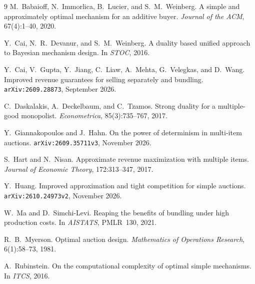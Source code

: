 \documentclass[11pt]{article}
\begin{document}
\begin{thebibliography}{9}
M.~Babaioff, N.~Immorlica, B.~Lucier, and S.~M.~Weinberg.
A simple and approximately optimal mechanism for an additive buyer.
\emph{Journal of the ACM}, 67(4):1--40, 2020.

Y.~Cai, N.~R.~Devanur, and S.~M.~Weinberg.
A duality based unified approach to Bayesian mechanism design.
In \emph{STOC}, 2016.

Y.~Cai, V.~Gupta, Y.~Jiang, C.~Liaw, A.~Mehta, G.~Velegkas, and D.~Wang.
Improved revenue guarantees for selling separately and bundling.
\texttt{arXiv:2609.28873}, September 2026.

C.~Daskalakis, A.~Deckelbaum, and C.~Tzamos.
Strong duality for a multiple-good monopolist.
\emph{Econometrica}, 85(3):735--767, 2017.

Y.~Giannakopoulos and J.~Hahn.
On the power of determinism in multi-item auctions.
\texttt{arXiv:2609.35711v3}, November 2026.

S.~Hart and N.~Nisan.
Approximate revenue maximization with multiple items.
\emph{Journal of Economic Theory}, 172:313--347, 2017.

Y.~Huang.
Improved approximation and tight competition for simple auctions.
\texttt{arXiv:2610.24973v2}, November 2026.

W.~Ma and D.~Simchi-Levi.
Reaping the benefits of bundling under high production costs.
In \emph{AISTATS}, PMLR~130, 2021.

R.~B.~Myerson.
Optimal auction design.
\emph{Mathematics of Operations Research}, 6(1):58--73, 1981.

A.~Rubinstein.
On the computational complexity of optimal simple mechanisms.
In \emph{ITCS}, 2016.
\end{thebibliography}
\end{document}
